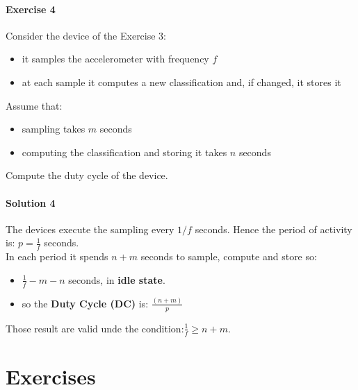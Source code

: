 \documentclass[10pt,a4paper]{report}
\theoremstyle{definition}
\begin{document}
\subsubsection{Exercise 4}\label{sec:exercise-4}
Consider the device of the Exercise 3:
\begin{itemize}
	\item 
	it samples the accelerometer with frequency $f$
	\item 
	at each sample it computes a new classification and, if changed, it stores it
\end{itemize}
Assume that:
\begin{itemize}
	
	\item 
	sampling takes $m$ seconds
	\item 
	computing the classification and storing it takes $n$ seconds
	
\end{itemize}
Compute the duty cycle of the device.
\subsubsection{Solution 4}\label{sec:solution-4}
The devices execute the sampling every $1/f$ seconds. Hence the period of activity is: $p = \frac{1}{f}$ seconds.\\
In each period it spends $n+m$ seconds to sample, compute and store so:
\begin{itemize}
	\item 
	$\frac{1}{f} - m -n$ seconds, in \textbf{idle state}.
	\item so the \textbf{Duty Cycle (DC)} is: $\frac{(n+m)}{p}$
\end{itemize}

Those result are valid unde the condition:$\frac{1}{f} \geq n+m$.






\fi


\chapter{Exercises}

\end{document}
